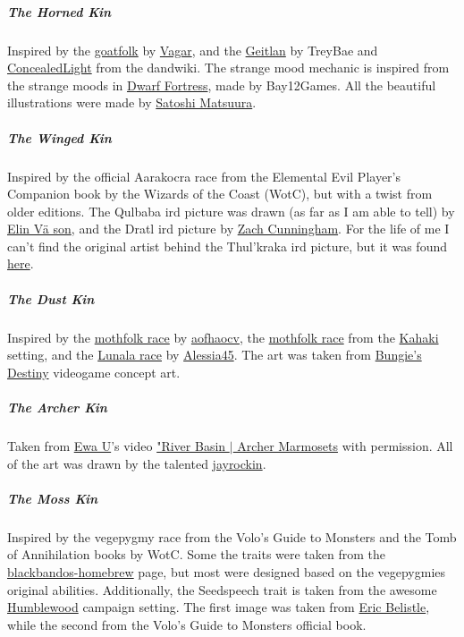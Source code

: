     \subparagraph{The Horned Kin} Inspired by the \href{https://homebrewery.naturalcrit.com/share/BksGVG27b}{goatfolk} by \href{https://www.reddit.com/user/Vagar/}{Vagar}, and the \href{https://www.dandwiki.com/wiki/Geitlan_(5e_Race)}{Geitlan} by TreyBae and \href{https://www.dandwiki.com/wiki/User:ConcealedLight}{ConcealedLight} from the dandwiki.
    The strange mood mechanic is inspired from the strange moods in \href{http://www.bay12games.com/dwarves/}{Dwarf Fortress}, made by Bay12Games.
    All the beautiful illustrations were made by \href{https://www.artstation.com/hiziripro}{Satoshi Matsuura}.

    \subparagraph{The Winged Kin} Inspired by the official Aarakocra race from the Elemental Evil Player's Companion book by the Wizards of the Coast (WotC), but with a twist from older editions.
    The Qulbaba ird picture was drawn (as far as I am able to tell) by \href{https://www.artstation.com/elinvason}{Elin V\"a son}, and the Dratl ird picture by \href{https://zachcunninghamart.weebly.com/}{Zach Cunningham}.
    For the life of me I can't find the original artist behind the Thul'kraka ird picture, but it was found \href{https://www.pinterest.com.au/pin/772859986026889236/?nic_v1=1aMPfjrcEzGBNwm803q3V1cypforv8WVbZ4jUXYP9aDqcJFyrfUt0Ww9rAOEq3SPSw}{here}.

    \subparagraph{The Dust Kin} Inspired by the \href{https://drive.google.com/file/d/1M200-YKAbl-nOLo52W--gkXVO6QpmihE/view}{mothfolk race} by \href{https://twitter.com/aofhaocv}{aofhaocv}, the \href{http://volthorne.wikidot.com/kahakai:races}{mothfolk race} from the \href{http://volthorne.wikidot.com/kahakai}{Kahaki} setting, and the \href{https://drive.google.com/file/d/1hxPW6VRRlcWuK9ukljLCO3ORSNlonwm1/view}{Lunala race} by \href{https://www.reddit.com/user/Alessia45/}{Alessia45}.
    The art was taken from \href{https://www.bungie.net/}{Bungie's Destiny} videogame concept art.

    \subparagraph{The Archer Kin} Taken from \href{https://www.youtube.com/channel/UCncTjqw75krp9j_wRRh5Gvw}{Ewa U}'s video \href{https://www.youtube.com/watch?v=_XCqpZwm39Q}{"River Basin $\mid$ Archer Marmosets} with permission.
    All of the art was drawn by the talented \href{https://jayrockin.tumblr.com/}{jayrockin}.

    \subparagraph{The Moss Kin} Inspired by the vegepygmy race from the Volo's Guide to Monsters and the Tomb of Annihilation books by WotC.
    Some the traits were taken from the \href{https://blackbandos-homebrew.fandom.com/wiki/Vegepygmy_(5e_Race)}{blackbandos-homebrew} page, but most were designed based on the vegepygmies original abilities.
    Additionally, the Seedspeech trait is taken from the awesome \href{https://thedeckofmany.com/collections/humblewood}{Humblewood} campaign setting.
    The first image was taken from \href{http://ericbelisle.com/}{Eric Belistle}, while the second from the Volo's Guide to Monsters official book.

